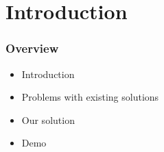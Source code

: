 \begin{frame}
  \titlepage
\end{frame}

\section{Introduction}

\begin{frame}[c] \frametitle{Overview}
  \begin{itemize} \setlength{\itemsep}{18pt}
    \item Introduction
    \item Problems with existing solutions
    \item Our solution
    \item Demo
  \end{itemize}
\end{frame}

